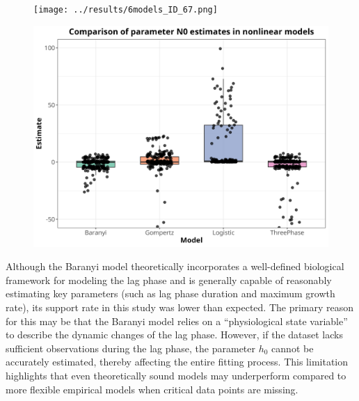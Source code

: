 \documentclass[12pt]{article}
\begin{document}
\begin{figure}[htbp]
  \centering
  \begin{minipage}[t]{0.45\textwidth}
    \centering
    \texttt{[image: ../results/6models\_ID\_67.png]}
    \label{fig:ID67}
  \end{minipage}
  \hfill
  \begin{minipage}[t]{0.45\textwidth}
    \centering
    \includegraphics[width=\linewidth]{../results/nonlinear_parameter_comparison_N0.png}
    \label{fig:paramN0}
  \end{minipage}

\end{figure}
Although the Baranyi model theoretically incorporates a well-defined biological framework for modeling the lag phase and is generally capable of reasonably estimating key parameters (such as lag phase duration and maximum growth rate), its support rate in this study was lower than expected. The primary reason for this may be that the Baranyi model relies on a ``physiological state variable'' to describe the dynamic changes of the lag phase. However, if the dataset lacks sufficient observations during the lag phase, the parameter $h_0$ cannot be accurately estimated, thereby affecting the entire fitting process. This limitation highlights that even theoretically sound models may underperform compared to more flexible empirical models when critical data points are missing.
\end{document}
